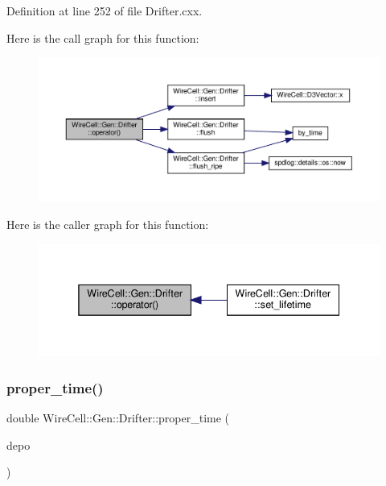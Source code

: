 Definition at line 252 of file Drifter.\+cxx.

Here is the call graph for this function\+:
\nopagebreak
\begin{figure}[H]
\begin{center}
\leavevmode
\includegraphics[width=350pt]{class_wire_cell_1_1_gen_1_1_drifter_aaac2664d52bd3ea47308e2760b256dab_cgraph}
\end{center}
\end{figure}
Here is the caller graph for this function\+:
\nopagebreak
\begin{figure}[H]
\begin{center}
\leavevmode
\includegraphics[width=338pt]{class_wire_cell_1_1_gen_1_1_drifter_aaac2664d52bd3ea47308e2760b256dab_icgraph}
\end{center}
\end{figure}
\mbox{\label{class_wire_cell_1_1_gen_1_1_drifter_a28657b21ffae9ef73622c60216fc2f59}} 
\subsubsection{\texorpdfstring{proper\+\_\+time()}{proper\_time()}}
{\footnotesize\ttfamily double Wire\+Cell\+::\+Gen\+::\+Drifter\+::proper\+\_\+time (\begin{DoxyParamCaption}\item[{\hyperlink{class_wire_cell_1_1_i_data_aff870b3ae8333cf9265941eef62498bc}{I\+Depo\+::pointer}}]{depo }\end{DoxyParamCaption})}

